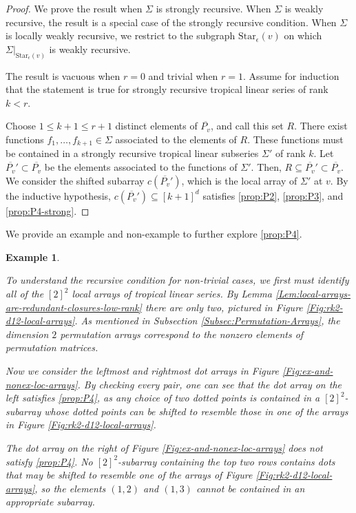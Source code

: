\documentclass{amsart}
\newtheorem{varexample}[theorem]{Example}
\newenvironment{example}{\begin{varexample}
		\begin{normalfont}}{\end{normalfont}
\end{varexample}}
\begin{document}
	\begin{proof}
		We prove the result when $\Sigma$ is strongly recursive. When $\Sigma$ is weakly recursive, the result is a special case of the strongly recursive condition. When $\Sigma$ is locally weakly recursive, we restrict to the subgraph $\mathrm{Star}_{\epsilon}(v)$ on which $\Sigma|_{\mathrm{Star}_{\epsilon}(v)}$ is weakly recursive.
		
		The result is vacuous when $r = 0$ and trivial when $r = 1$. Assume for induction that the statement is true for strongly recursive tropical linear series of rank $k < r$.
		
		Choose $1 \leq k+1 \leq r+1$ distinct elements of $\overline{P_v}$, and call this set $R$. There exist functions $f_1, \ldots, f_{k+1} \in \Sigma$ associated to the elements of $R$. These functions must be contained in a strongly recursive tropical linear subseries $\Sigma'$ of rank $k$. Let $\overline{P_v}' \subset \overline{P_v}$ be the elements associated to the functions of $\Sigma'$. Then, $R \subseteq \overline{P_v}' \subset \overline{P_v}$. We consider the shifted subarray $c(\overline{P_v}')$, which is the local array of $\Sigma'$ at $v$. By the inductive hypothesis, $c(\overline{P_v}') \subseteq [k+1]^d$ satisfies \ref{prop:P2}, \ref{prop:P3}, and \ref{prop:P4-strong}.
	\end{proof}
	
	We provide an example and non-example to further explore \ref{prop:P4}.
	
	\begin{example}
		To understand the recursive condition for non-trivial cases, we first must identify all of the $[2]^2$ local arrays of tropical linear series. By Lemma \ref{Lem:local-arrays-are-redundant-closures-low-rank} there are only two, pictured in Figure \ref{Fig:rk2-d12-local-arrays}. As mentioned in Subsection \ref{Subsec:Permutation-Arrays}, the dimension $2$ permutation arrays correspond to the nonzero elements of permutation matrices.
		
		Now we consider the leftmost and rightmost dot arrays in Figure \ref{Fig:ex-and-nonex-loc-arrays}. By checking every pair, one can see that the dot array on the left satisfies \ref{prop:P4}, as any choice of two dotted points is contained in a $[2]^2$-subarray whose dotted points can be shifted to resemble those in one of the arrays in Figure \ref{Fig:rk2-d12-local-arrays}.
		
		The dot array on the right of Figure \ref{Fig:ex-and-nonex-loc-arrays} does not satisfy \ref{prop:P4}. No $[2]^2$-subarray containing the top two rows contains dots that may be shifted to resemble one of the arrays of Figure \ref{Fig:rk2-d12-local-arrays}, so the elements $(1,2)$ and $(1,3)$ cannot be contained in an appropriate subarray.
	\end{example}
	
\end{document}
